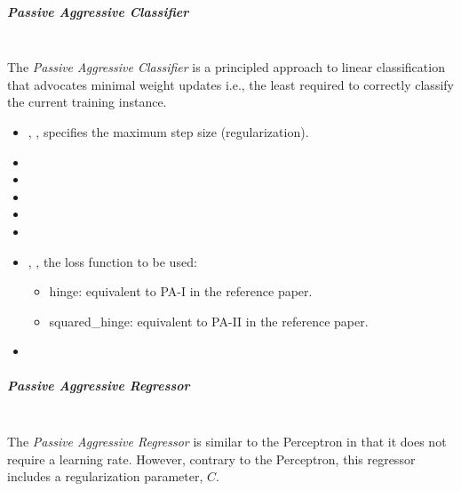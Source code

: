 \subparagraph{Passive Aggressive Classifier}
\mbox{}
\\The \textit{Passive Aggressive Classifier} is a principled approach to linear
classification that advocates minimal weight updates i.e., the least required 
to correctly classify the current training instance.
%
\begin{itemize}
  \item {}, , specifies the maximum step size
  (regularization).
  \item {}
  \item {}
  \item {}
  \item {}
  \item \verDescriptionB
  \item {}, , the loss function to
  be used:
  \begin{itemize}
    \item hinge: equivalent to PA-I in the reference paper. 
    \item squared\_hinge: equivalent to PA-II in the reference paper.
  \end{itemize}
  \item \warmStartDescription{}
\end{itemize}

\subparagraph{Passive Aggressive Regressor}
\mbox{}
\\The \textit{Passive Aggressive Regressor} is similar to the Perceptron in that
it does not require a learning rate.
%
However, contrary to the Perceptron, this regressor includes a regularization
parameter, $C$.

